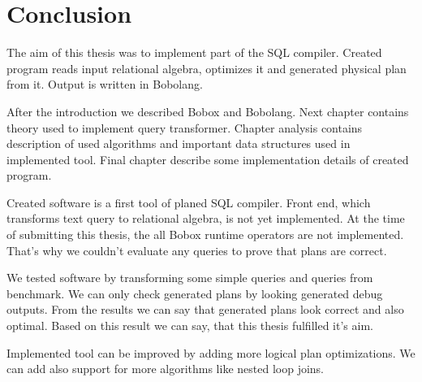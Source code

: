 \chapter{Conclusion}

The aim of this thesis was to implement part of the SQL compiler. Created program reads input relational algebra, optimizes it and generated physical plan from it. Output is written in Bobolang.

After the introduction we described Bobox and Bobolang. Next chapter contains theory used to implement query transformer. Chapter analysis contains description of used algorithms and important data structures used in implemented tool. Final chapter describe some implementation details of created program.

Created software is a first tool of planed SQL compiler. Front end, which transforms text query to relational algebra, is not yet implemented. At the time of submitting this thesis, the all Bobox runtime operators are not implemented. That's why we couldn't evaluate any queries to prove that plans are correct.

We tested software by transforming some simple queries and queries from benchmark\cite{benchmark}. We can only check generated plans by looking generated debug outputs. From the results we can say that generated plans look correct and also optimal. Based on this result we can say, that this thesis fulfilled it's aim. 


Implemented tool can be improved by adding more logical plan optimizations. We can add also support for more algorithms like nested loop joins.

